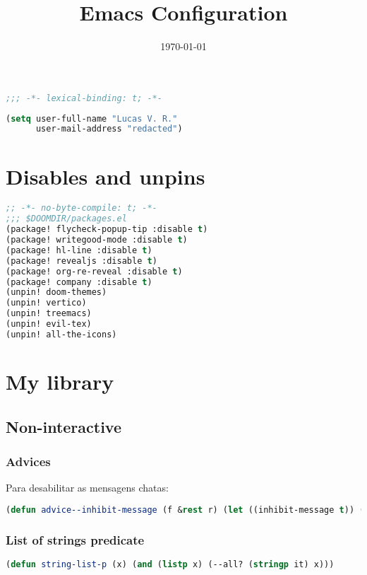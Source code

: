 \documentclass[11pt]{article}
\date{\today}
\title{Emacs Configuration}
\begin{document}
\maketitle

\begin{lstlisting}[language=Lisp]
;;; -*- lexical-binding: t; -*-
\end{lstlisting}

\begin{lstlisting}[language=Lisp]
(setq user-full-name "Lucas V. R."
      user-mail-address "redacted")
\end{lstlisting}
\section{Disables and unpins}
\label{sec:disables-and-unpins}
\begin{lstlisting}[language=Lisp]
;; -*- no-byte-compile: t; -*-
;;; $DOOMDIR/packages.el
(package! flycheck-popup-tip :disable t)
(package! writegood-mode :disable t)
(package! hl-line :disable t)
(package! revealjs :disable t)
(package! org-re-reveal :disable t)
(package! company :disable t)
(unpin! doom-themes)
(unpin! vertico)
(unpin! treemacs)
(unpin! evil-tex)
(unpin! all-the-icons)
\end{lstlisting}

\section{My library}
\label{sec:my-library}


\subsection{Non-interactive}
\label{sec:non-interactive}


\subsubsection{Advices}
\label{sec:advices}
Para desabilitar as mensagens chatas:

\begin{lstlisting}[language=Lisp]
(defun advice--inhibit-message (f &rest r) (let ((inhibit-message t)) (apply f r)))
\end{lstlisting}

\subsubsection{List of strings predicate}
\label{sec:list-of-strings-predicate}
\begin{lstlisting}[language=Lisp]
(defun string-list-p (x) (and (listp x) (--all? (stringp it) x)))
\end{lstlisting}
\end{document}
